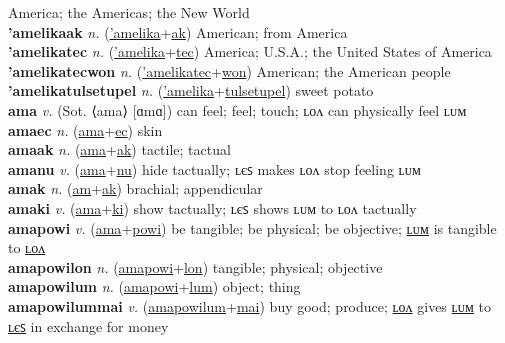 America; the Americas; the New World \label{'amelika} \\
\textbf{'amelikaak} \textit{n.} (\hyperref['amelika]{'amelika}+\hyperref[ak]{ak})
American; from America \label{'amelikaak} \\
\textbf{'amelikatec} \textit{n.} (\hyperref['amelika]{'amelika}+\hyperref[tec]{tec})
America; U.S.A.; the United States of America \label{'amelikatec} \\
\textbf{'amelikatecwon} \textit{n.} (\hyperref['amelikatec]{'amelikatec}+\hyperref[won]{won})
American; the American people \label{'amelikatecwon} \\
\textbf{'amelikatulsetupel} \textit{n.} (\hyperref['amelika]{'amelika}+\hyperref[tulsetupel]{tulsetupel})
sweet potato \label{'amelikatulsetupel} \\
\textbf{ama} \textit{v.} (Sot. ⟨ama⟩ [ɑmɑ])
can feel; feel; touch; ʟᴏᴧ can physically feel ʟᴜᴍ \label{ama} \\
\textbf{amaec} \textit{n.} (\hyperref[ama]{ama}+\hyperref[ec]{ec})
skin \label{amaec} \\
\textbf{amaak} \textit{n.} (\hyperref[ama]{ama}+\hyperref[ak]{ak})
tactile; tactual \label{amaak} \\
\textbf{amanu} \textit{v.} (\hyperref[ama]{ama}+\hyperref[nu]{nu})
hide tactually; ʟєꜱ makes ʟᴏᴧ stop feeling ʟᴜᴍ \label{amanu} \\
\textbf{amak} \textit{n.} (\hyperref[am]{am}+\hyperref[ak]{ak})
brachial; appendicular \label{amak} \\
\textbf{amaki} \textit{v.} (\hyperref[ama]{ama}+\hyperref[ki]{ki})
show tactually; ʟєꜱ shows ʟᴜᴍ to ʟᴏᴧ tactually \label{amaki} \\
\textbf{amapowi} \textit{v.} (\hyperref[ama]{ama}+\hyperref[powi]{powi})
be tangible; be physical; be objective; \hyperref[amapowilum]{ʟᴜᴍ} is tangible to \hyperref[amapowilon]{ʟᴏᴧ} \label{amapowi} \\
\textbf{amapowilon} \textit{n.} (\hyperref[amapowi]{amapowi}+\hyperref[lon]{lon})
tangible; physical; objective \label{amapowilon} \\
\textbf{amapowilum} \textit{n.} (\hyperref[amapowi]{amapowi}+\hyperref[lum]{lum})
object; thing \label{amapowilum} \\
\textbf{amapowilummai} \textit{v.} (\hyperref[amapowilum]{amapowilum}+\hyperref[mai]{mai})
buy good; produce; \hyperref[amapowilummailon]{ʟᴏᴧ} gives \hyperref[amapowilummailum]{ʟᴜᴍ} to \hyperref[amapowilummailes]{ʟєꜱ} in exchange for money \label{amapowilummai} \\
